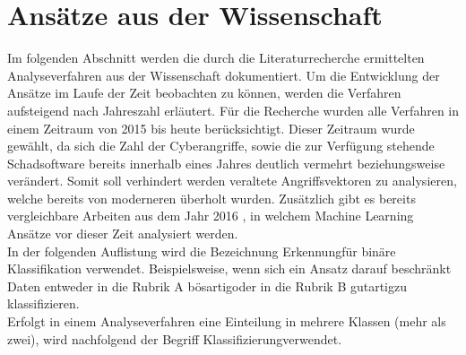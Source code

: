 \documentclass[
    12pt, %
    DIV10,
    ngerman, %
    a4paper, %
    oneside, %
    titlepage, %
    parskip=half, %
    headings=normal, %
    listof=totoc, %
    bibliography=totoc, %
    index=totoc, %
    captions=tableheading, %
    final %
]{scrreprt}
\begin{document}
%
\section{Ansätze aus der Wissenschaft}
\label{sec:aw}
Im folgenden Abschnitt werden die durch die Literaturrecherche ermittelten Analyseverfahren aus der Wissenschaft dokumentiert. Um die Entwicklung der Ansätze im Laufe der Zeit beobachten zu können, werden die Verfahren aufsteigend nach Jahreszahl erläutert. Für die Recherche wurden alle Verfahren in einem Zeitraum von 2015 bis heute berücksichtigt. Dieser Zeitraum wurde gewählt, da sich die Zahl der Cyberangriffe, sowie die zur Verfügung stehende Schadsoftware bereits innerhalb eines Jahres deutlich vermehrt beziehungsweise verändert. Somit soll verhindert werden veraltete Angriffsvektoren zu analysieren, welche bereits von moderneren überholt wurden. Zusätzlich gibt es bereits vergleichbare Arbeiten aus dem Jahr 2016 \parencite[s.][]{Buczak2016}, in welchem Machine Learning Ansätze vor dieser Zeit analysiert werden.\\
In der folgenden Auflistung wird die Bezeichnung \glqq Erkennung\grqq für binäre Klassifikation verwendet. Beispielsweise, wenn sich ein Ansatz darauf beschränkt Daten entweder in die Rubrik A \glqq bösartig\grqq oder in die Rubrik B \glqq gutartig\grqq zu klassifizieren.\\
Erfolgt in einem Analyseverfahren eine Einteilung in mehrere Klassen (mehr als zwei), wird nachfolgend der Begriff 
\glqq Klassifizierung\grqq verwendet.
\\\\
\end{document}
